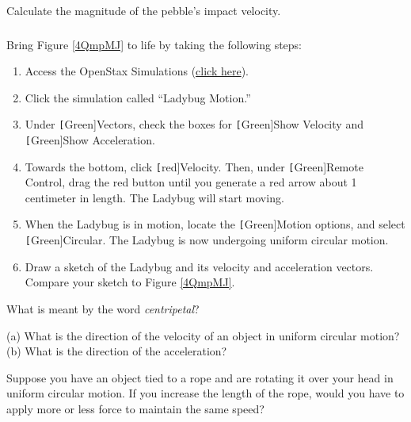 \documentclass[main-physics.tex]{subfiles}
\begin{document}
\begin{exercise} \label{4gdNXl}
    Calculate the magnitude of the pebble's impact velocity.
\end{exercise}


\cyanhrule

\subsubsection*{}

\begin{exercise} \label{N066SF}
    Bring Figure \ref{4QmpMJ} to life by taking the following steps:

    \begin{enumerate}
        \item Access the OpenStax Simulations (\href{https://veillette.github.io/simulations/}{click here}).
        \item Click the simulation called ``Ladybug Motion.''
        \item Under \texttt[Green]{Vectors}, check the boxes for \texttt[Green]{Show Velocity} and \texttt[Green]{Show Acceleration}. 
        \item Towards the bottom, click \texttt[red]{Velocity}. Then, under \texttt[Green]{Remote Control}, drag the red button until you generate a red arrow about 1 centimeter in length. The Ladybug will start moving.
        \item When the Ladybug is in motion, locate the \texttt[Green]{Motion} options, and select \texttt[Green]{Circular}. The Ladybug is now undergoing uniform circular motion.
        \item Draw a sketch of the Ladybug and its velocity and acceleration vectors. Compare your sketch to Figure \ref{4QmpMJ}. 
    \end{enumerate}
\end{exercise}

\begin{exercise} \label{x2YCzr}
    What is meant by the word \textit{centripetal}?
\end{exercise}

\begin{exercise} \label{S4rGIt}
    (a) What is the direction of the velocity of an object in uniform circular motion? (b) What is the direction of the acceleration?
\end{exercise}

\begin{exercise} \label{aVu3ZA}
    Suppose you have an object tied to a rope and are rotating it over your head in uniform circular motion. If you increase the length of the rope, would you have to apply more or less force to maintain the same speed?
\end{exercise}
\end{document}
